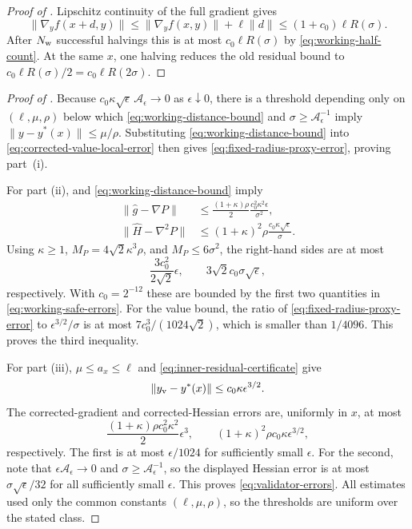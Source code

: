 \documentclass{article}
\begin{document}
\begin{proof}[Proof of ]
Lipschitz continuity of the full gradient gives
\[
 \|\nabla_yf(x+d,y)\|
 \le\|\nabla_yf(x,y)\|+\ell\|d\|
 \le(1+c_0)\ell R(\sigma).
\]
After $N_{\rm w}$ successful halvings this is at most
$c_0\ell R(\sigma)$ by \eqref{eq:working-half-count}.  At the same
$x$, one halving reduces the old residual bound to
$c_0\ell R(\sigma)/2=c_0\ell R(2\sigma)$.
\end{proof}

\begin{proof}[Proof of ]
Because
$c_0\kappa\sqrt\epsilon\,\mathcal A_\epsilon\to0$ as
$\epsilon\downarrow0$, there is a threshold depending only on
$(\ell,\mu,\rho)$ below
which \eqref{eq:working-distance-bound} and
$\sigma\ge\mathcal A_\epsilon^{-1}$ imply
$\|y-y^*(x)\|\le\mu/\rho$.  Substituting
\eqref{eq:working-distance-bound} into
\eqref{eq:corrected-value-local-error} then gives
\eqref{eq:fixed-radius-proxy-error}, proving part~(i).

For part (ii),  and
\eqref{eq:working-distance-bound} imply
\begin{align*}
 \|\widehat g-\nabla P\|
 &\le\frac{(1+\kappa)\rho}{2}
       \frac{c_0^2\kappa^2\epsilon}{\sigma^2},\\
 \|\widehat H-\nabla^2P\|
 &\le(1+\kappa)^2\rho
       \frac{c_0\kappa\sqrt\epsilon}{\sigma}.
\end{align*}
Using $\kappa\ge1$, $M_P=4\sqrt2\kappa^3\rho$, and
$M_P\le6\sigma^2$, the right-hand sides are at most
\[
 \frac{3c_0^2}{2\sqrt2}\epsilon,
 \qquad
 3\sqrt2c_0\sigma\sqrt\epsilon,
\]
respectively.  With $c_0=2^{-12}$ these are bounded by the first two
quantities in \eqref{eq:working-safe-errors}.  For the value bound, the
ratio of \eqref{eq:fixed-radius-proxy-error} to
$\epsilon^{3/2}/\sigma$ is at most $7c_0^3/(1024\sqrt2)$, which is
smaller than $1/4096$.  This proves the third inequality.

For part (iii), $\mu\le a_x\le\ell$ and
\eqref{eq:inner-residual-certificate} give
\[
 \|y_{\rm v}-y^*(x)\|
 \le c_0\kappa\epsilon^{3/2}.
\]
The corrected-gradient and corrected-Hessian errors are, uniformly in
$x$, at most
\[
 \frac{(1+\kappa)\rho c_0^2\kappa^2}{2}\epsilon^3,
 \qquad
 (1+\kappa)^2\rho c_0\kappa\epsilon^{3/2},
\]
respectively.  The first is at most $\epsilon/1024$ for sufficiently
small $\epsilon$.  For the second, note that
$\epsilon\mathcal A_\epsilon\to0$ and
$\sigma\ge\mathcal A_\epsilon^{-1}$, so
the displayed Hessian error is at most
$\sigma\sqrt\epsilon/32$ for all sufficiently small $\epsilon$.
This proves \eqref{eq:validator-errors}.  All estimates used only the
common constants $(\ell,\mu,\rho)$, so the thresholds are uniform over
the stated class.
\end{proof}
\end{document}
